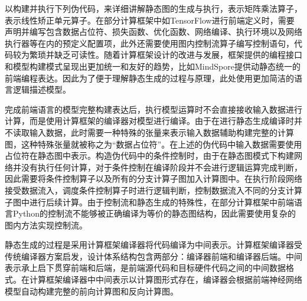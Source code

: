 \documentclass[letterpaper,10pt,english]{sphinxmanual}
\begin{document}
\sphinxAtStartPar
以构建并执行下列伪代码，来详细讲解静态图的生成与执行，表示矩阵乘法算子，表示线性矫正单元算子。在部分计算框架中如TensorFlow进行前端定义时，需要声明并编写包含数据占位符、损失函数、优化函数、网络编译、执行环境以及网络执行器等在内的预定义配置项，此外还需要使用图内控制流算子编写控制语句，代码较为繁琐并缺乏可读性。随着计算框架设计的改进与发展，框架提供的编程接口和模型构建模式呈现出更加统一和友好的趋势，比如MindSpore提供动静态统一的前端编程表达。因此为了便于理解静态生成的过程与原理，此处使用更加简洁的语言逻辑描述模型。

\begin{sphinxVerbatim}[commandchars=\\\{\}]
  
     
           
           
        
      
     
\end{sphinxVerbatim}

\sphinxAtStartPar
完成前端语言的模型完整构建表达后，执行模型运算时不会直接接收输入数据进行计算，而是使用计算框架的编译器对模型进行编译。由于在进行静态生成编译时并不读取输入数据，此时需要一种特殊的张量来表示输入数据辅助构建完整的计算图，这种特殊张量就被称之为“数据占位符”。在上述的伪代码中输入数据需要使用占位符在静态图中表示。构造伪代码中的条件控制时，由于在静态图模式下构建网络并没有执行任何计算，对于条件控制在编译阶段并不会进行逻辑运算完成判断，因此需要将条件控制算子以及所有的分支计算子图加入计算图中。在执行阶段网络接受数据流入，调度条件控制算子时进行逻辑判断，控制数据流入不同的分支计算子图中进行后续计算。由于控制流和静态生成的特殊性，在部分计算框架中前端语言Python的控制流不能够被正确编译为等价的静态图结构，因此需要使用复杂的图内方法实现控制流。

\sphinxAtStartPar
静态生成的过程是采用计算框架编译器将代码编译为中间表示。计算框架编译器受传统编译器方案启发，设计体系结构包含两部分：编译器前端和编译器后端。中间表示承上启下贯穿前端和后端，是前端源代码和目标硬件代码之间的中间数据格式。在计算框架编译器中中间表示以计算图形式存在，编译器会根据前端神经网络模型自动构建完整的前向计算图和反向计算图。
\end{document}
